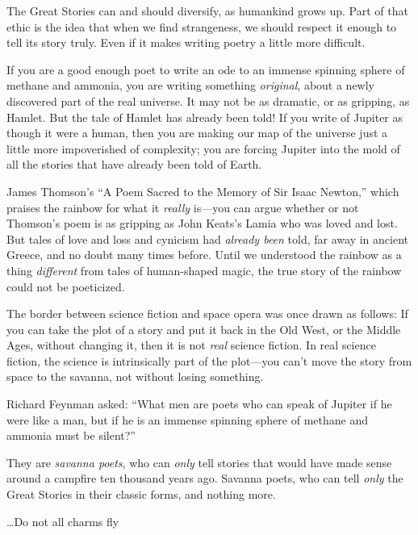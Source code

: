 {
 The Great Stories can and should diversify, as humankind grows up.
Part of that ethic is the idea that when we find strangeness, we should
respect it enough to tell its story truly. Even if it makes writing
poetry a little more difficult.}

{
 If you are a good enough poet to write an ode to an immense
spinning sphere of methane and ammonia, you are writing something
\textit{original}, about a newly discovered part of the real universe.
It may not be as dramatic, or as gripping, as Hamlet. But the tale of
Hamlet has already been told! If you write of Jupiter as though it were
a human, then you are making our map of the universe just a little more
impoverished of complexity; you are forcing Jupiter into the mold of
all the stories that have already been told of Earth.}

{
 James Thomson's ``A Poem Sacred
to the Memory of Sir Isaac Newton,'' which praises
the rainbow for what it \textit{really} is---you can argue whether or
not Thomson's poem is as gripping as John
Keats's Lamia who was loved and lost. But tales of love
and loss and cynicism had \textit{already been} told, far away in
ancient Greece, and no doubt many times before. Until we understood the
rainbow as a thing \textit{different} from tales of human-shaped magic,
the true story of the rainbow could not be poeticized.}

{
 The border between science fiction and space opera was once drawn
as follows: If you can take the plot of a story and put it back in the
Old West, or the Middle Ages, without changing it, then it is not
\textit{real} science fiction. In real science fiction, the science is
intrinsically part of the plot---you can't move the
story from space to the savanna, not without losing something.}

{
 Richard Feynman asked: ``What men are poets who
can speak of Jupiter if he were like a man, but if he is an immense
spinning sphere of methane and ammonia must be
silent?''}

{
 They are \textit{savanna poets}, who can \textit{only} tell
stories that would have made sense around a campfire ten thousand years
ago. Savanna poets, who can tell \textit{only} the Great Stories in
their classic forms, and nothing more.}

\myendsectiontext


\bigskip


{
 \ldots Do not all charms fly}

